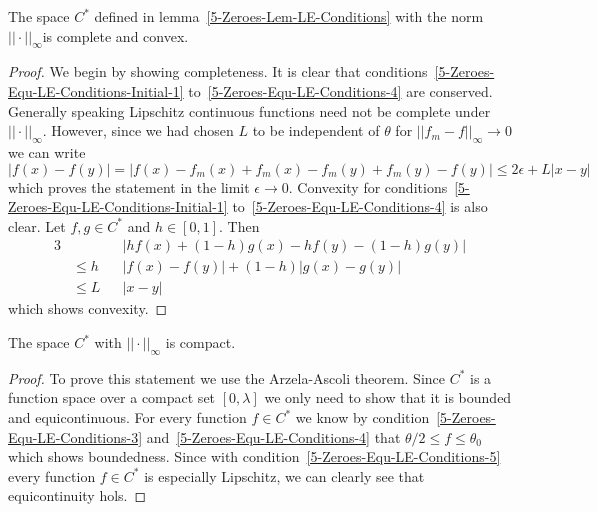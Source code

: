 \begin{lemma}
	The space $C^*$ defined in lemma~\ref{5-Zeroes-Lem-LE-Conditions} with the norm $||\cdot||_\infty$is complete and convex.
	\label{5-Zeroes-Lem-LE-Convex-Complete}
\end{lemma}
\begin{proof}
	We begin by showing completeness.
	It is clear that conditions~\eqref{5-Zeroes-Equ-LE-Conditions-Initial-1} to~\eqref{5-Zeroes-Equ-LE-Conditions-4} are conserved.
	Generally speaking Lipschitz continuous functions need not be complete under $||\cdot||_\infty$.
	However, since we had chosen $L$ to be independent of $\theta$ for $||f_m-f||_\infty\rightarrow0$ we can write
	\begin{equation}
		|f(x)-f(y)|=|f(x)-f_m(x)+f_m(x)-f_m(y)+f_m(y)-f(y)|\leq 2\epsilon+L|x-y|
		\label{eq:5-Zeroes-LE-Equicontinuity-Proof}
	\end{equation}
	which proves the statement in the limit $\epsilon\rightarrow0$.
	Convexity for conditions~\eqref{5-Zeroes-Equ-LE-Conditions-Initial-1} to~\eqref{5-Zeroes-Equ-LE-Conditions-4} is also clear.
	Let $f,g\in C^*$ and $h\in[0,1]$.
	Then
	\begin{alignat}{3}
		&&&|hf(x)+(1-h)g(x)-hf(y)-(1-h)g(y)|\\
		&\leq h&&|f(x)-f(y)|+ (1-h)|g(x)-g(y)|\\
		&\leq L&&|x-y|
	\end{alignat}
	which shows convexity.
\end{proof}\noindent
\begin{lemma}
	The space $C^*$ with $||\cdot||_\infty$ is compact.
	\label{5-Zeroes-Lem-LE-Compact}
\end{lemma}
\begin{proof}
	To prove this statement we use the Arzela-Ascoli theorem.
	Since $C^*$ is a function space over a compact set $[0,\lambda]$ we only need to show that it is bounded and equicontinuous.
	For every function $f\in C^*$ we know by condition~\eqref{5-Zeroes-Equ-LE-Conditions-3} and~\eqref{5-Zeroes-Equ-LE-Conditions-4} that $\theta/2\leq f\leq\theta_0$ which shows boundedness.
	Since with condition~\eqref{5-Zeroes-Equ-LE-Conditions-5} every function $f\in C^*$ is especially Lipschitz, we can clearly see that equicontinuity hols.
\end{proof}

